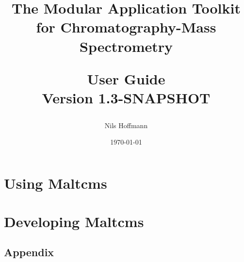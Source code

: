 \documentclass[12pt,a4paper,onecolumn,twoside,titlepage,headsepline,open=any]{scrbook}
\author{Nils Hoffmann}
\title{The Modular Application Toolkit for Chromatography-Mass Spectrometry\\\vspace{1ex}\begin{Large}
User Guide\\
Version 1.3-SNAPSHOT
\end{Large}}
\date{\today}
\begin{document}
\frontmatter    %
\maketitle       %





\tableofcontents   %
 
\mainmatter    %

\part{Using Maltcms}


\part{Developing Maltcms}

\backmatter
\chapter{Appendix}
\lstlistoflistings
\printglossaries
\end{document}
